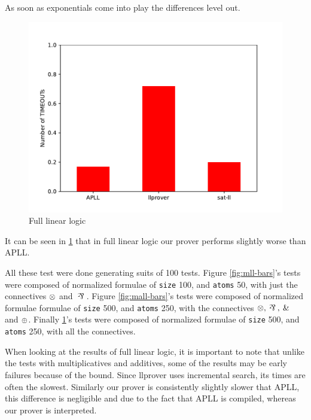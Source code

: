 \documentclass[a4paper, 12pt, english]{report}
\begin{document}
As soon as exponentials come into play the differences level out.
\begin{figure}[h!]
	\centering
	\includegraphics[scale=0.5]{./images/cll-500-250.pdf}
	\caption{Full linear logic}
	\label{fig:cll-bars}
\end{figure}
It can be seen in \ref{fig:cll-bars} that in full linear logic our prover performs slightly worse than APLL.

All these test were done generating suits of 100 tests.
Figure \ref{fig:mll-bars}'s tests were composed of normalized formulae of \texttt{size} 100, and \texttt{atoms} 50, with just the connectives $\otimes$ and $\llpar$.
Figure \ref{fig:mall-bars}'s tests were composed of normalized formulae formulae of \texttt{size} 500, and \texttt{atoms} 250, with the connectives $\llten, \llpar, \llwith$ and $\oplus$.
Finally \ref{fig:cll-bars}'s tests were composed of normalized formulae of \texttt{size} 500, and \texttt{atoms} 250, with all the connectives.

When looking at the results of full linear logic, it is important to note that unlike the tests with multiplicatives and additives, some of the results may be early failures because of the bound.
Since llprover uses incremental search, its times are often the slowest.
Similarly our prover is consistently slightly slower that APLL, this difference is negligible and due to the fact that APLL is compiled, whereas our prover is interpreted.




\end{document}

